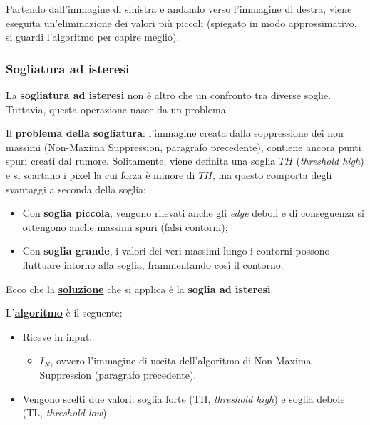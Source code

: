 \documentclass[a4paper]{article}
\begin{document}
	\noindent
	Partendo dall'immagine di sinistra e andando verso l'immagine di destra, viene eseguita un'eliminazione dei valori più piccoli (spiegato in modo approssimativo, si guardi l'algoritmo per capire meglio).\newpage
	
	\subsubsection{Sogliatura ad isteresi}
	
	La \textcolor{Red3}{\textbf{sogliatura ad isteresi}} non è altro che un confronto tra diverse soglie. Tuttavia, questa operazione nasce da un problema.\newline
	
	\noindent
	Il \textbf{problema della sogliatura}: l'immagine creata dalla soppressione dei non massimi (Non-Maxima Suppression, paragrafo precedente), contiene ancora punti spuri creati dal rumore.\newline
	Solitamente, viene definita una soglia $TH$ (\emph{threshold high}) e si scartano i pixel la cui forza è minore di $TH$, ma questo comporta degli svantaggi a seconda della soglia:
	\begin{itemize}
		\item Con \textbf{soglia piccola}, vengono rilevati anche gli \emph{edge} deboli e di conseguenza si \underline{ottengono anche massimi spuri} (falsi contorni);
		
		\item Con \textbf{soglia grande}, i valori dei veri massimi lungo i contorni possono fluttuare intorno alla soglia, \underline{frammentando} così il \underline{contorno}.
	\end{itemize}
	Ecco che la \textbf{\underline{soluzione}} che si applica è la \textbf{soglia ad isteresi}.\newline
	
	\noindent
	L'\textbf{\underline{algoritmo}} è il seguente:
	\begin{itemize}
		\item Riceve in input:
		\begin{itemize}
			\item $I_{N}$, ovvero l'immagine di uscita dell'algoritmo di Non-Maxima Suppression (paragrafo precedente).
		\end{itemize}
	
		\item Vengono scelti due valori: soglia forte (TH, \emph{threshold high}) e soglia debole (TL, \emph{threshold low})
	\end{itemize}
\end{document}
